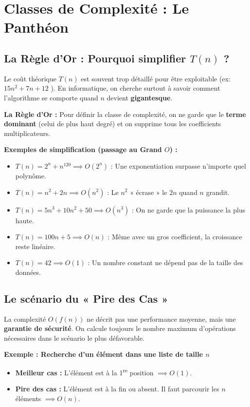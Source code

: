 \section*{Classes de Complexité : Le Panthéon }

\subsection*{La Règle d'Or : Pourquoi simplifier $T(n)$ ?}

Le coût théorique $T(n)$ est souvent trop détaillé pour être exploitable (ex: $15n^2 + 7n + 12$ ). En informatique, on cherche surtout à savoir comment l'algorithme se comporte quand $n$ devient \textbf{gigantesque}.

\begin{Comprendre}
 \textbf{La Règle d'Or :} Pour définir la classe de complexité, on ne garde que le \textbf{terme dominant} (celui de plus haut degré) et on supprime tous les coefficients multiplicateurs.
\end{Comprendre}

\textbf{Exemples de simplification (passage au Grand $O$) :}
\begin{itemize}
    \item $T(n) = 2^n + n^{120} \implies O(2^n)$ : Une exponentiation surpasse n'importe quel polynôme.
    \item $T(n) = n^2 + 2n \implies O(n^2)$ : Le $n^2$ « écrase » le $2n$ quand $n$ grandit.
    \item $T(n) = 5n^3 + 10n^2 + 50 \implies O(n^3)$ : On ne garde que la puissance la plus haute.
    \item $T(n) = 100n + 5 \implies O(n)$ : Même avec un gros coefficient, la croissance reste linéaire.
    \item $T(n) = 42 \implies O(1)$ : Un nombre constant ne dépend pas de la taille des données.
\end{itemize}

\subsection*{Le scénario du « Pire des Cas » }

La complexité $O(f(n))$ ne décrit pas une performance moyenne, mais une \textbf{garantie de sécurité}. On calcule toujours le nombre maximum d'opérations nécessaires dans le scénario le plus défavorable.

\textbf{Exemple : Recherche d'un élément dans une liste de taille $n$ }
\begin{itemize}
    \item \textbf{Meilleur cas :} L'élément est à la 1\textsuperscript{re} position $\implies O(1)$.
    \item \textbf{Pire des cas :} L'élément est à la fin ou absent. Il faut parcourir les $n$ éléments $\implies O(n)$.
\end{itemize}

